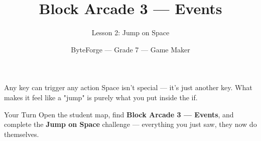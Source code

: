 \documentclass[aspectratio=169]{beamer}
\title{Block Arcade 3 — Events}
\subtitle{Lesson 2: Jump on Space}
\author{ByteForge --- Grade 7 --- Game Maker}
\date{}
\begin{document}
\begin{frame}
    \titlepage
\end{frame}

\begin{frame}{Any key can trigger any action}
    \Large
    Space isn't special — it's just another key. What makes it feel like a "jump" is purely what you put inside the if.
\end{frame}

\begin{frame}{Your Turn}
    \Large
    Open the student map, find \textbf{Block Arcade 3 — Events}, and complete
    the \textbf{Jump on Space} challenge --- everything you just saw, they now do themselves.
\end{frame}
\end{document}
